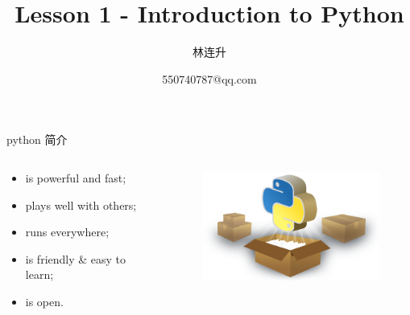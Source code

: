 \documentclass[aspectratio=169]{beamer}
\title{Lesson 1 - Introduction to Python}
\author{林连升}
\institute{福州大学硕士 \\
网龙网络公司工程院研究员}
\date{550740787@qq.com}
\begin{document}
  \maketitle


    \begin{frame}{python 简介}
      \begin{columns}
      \begin{column}[t]{0.5\textwidth}
        \begin{itemize}
          \item is powerful and fast;
          \item plays well with others;
          \item runs everywhere;
          \item is friendly \& easy to learn;
          \item is open.
        \end{itemize}
      \end{column}

      \begin{column}[t]{0.5\textwidth}
        \begin{figure}
        \includegraphics[width=6cm,height=3.68cm]{landing-about.png}
        \end{figure}
      \end{column}

      \end{columns}
      
    \end{frame}
\end{document}
